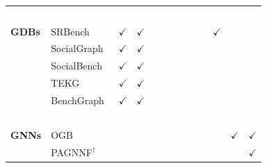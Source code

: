 \begin{landscape}
\begin{table}[htbp]
\begin{tabular}{ll|ccccccccc}
               {\footnotesize ~              }  & {\footnotesize ~                                       }      &       ~       &       ~       &       ~       &       ~       &       ~       &       ~       &        ~       &       ~       &      ~        \\
               {\footnotesize \textbf{GDBs}  }  & {\footnotesize SRBench~\cite{Zhang2012}                }      & $\checkmark$  & $\checkmark$  &               &               &               &               & $\checkmark$   &               &               \\
               {\footnotesize ~              }  & {\footnotesize SocialGraph~\cite{Angles2013}           }      & $\checkmark$  & $\checkmark$  &               &               &               &               &                &               &               \\
               {\footnotesize ~              }  & {\footnotesize SocialBench~\cite{Erling2015}           }      & $\checkmark$  & $\checkmark$  &               &               &               &               &                &               &               \\
               {\footnotesize ~              }  & {\footnotesize TEKG~\cite{Mcnight2021}           }            & $\checkmark$  & $\checkmark$  &               &               &               &               &                &               &               \\
               {\footnotesize ~              }  & {\footnotesize BenchGraph~\cite{Javor2022,Javor2023}   }      & $\checkmark$  & $\checkmark$  &               &               &               &               &                &               &               \\
               {\footnotesize ~              }  & {\footnotesize ~                                       }      &       ~       &       ~       &       ~       &       ~       &       ~       &       ~       &        ~       &       ~       &      ~        \\
               {\footnotesize \textbf{GNNs}  }  & {\footnotesize OGB~\cite{Hu2020}                       }      &               &               &               &               &               &               &                & $\checkmark$  & $\checkmark$  \\
               {\footnotesize ~              }  & {\footnotesize PAGNNF${^\dagger}$~\cite{Wu2021a}          }   &               &               &               &               &               &               &                &               & $\checkmark$  \\

\end{tabular}
\end{table}
\end{landscape}
